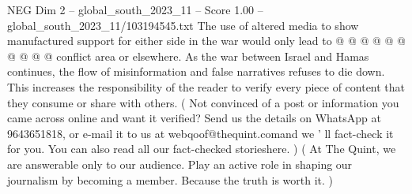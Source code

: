 \begin{textsample}{NEG Dim 2 – global\_south\_2023\_11 – Score 1.00 – global\_south\_2023\_11/103194545.txt}
The use of altered media to show manufactured support for either side in the war would only lead to @ @ @ @ @ @ @ @ @ @ conflict area or elsewhere.
As the war between Israel and Hamas continues, the flow of misinformation and false narratives refuses to die down.
This increases the responsibility of the reader to verify every piece of content that they consume or share with others. ( Not convinced of a post or information you came across online and want it verified?
Send us the details on WhatsApp at 9643651818, or e-mail it to us at webqoof@thequint.comand we ' ll fact-check it for you.
You can also read all our fact-checked storieshere. ) ( At The Quint, we are answerable only to our audience.
Play an active role in shaping our journalism by becoming a member.
Because the truth is worth it. )

\end{textsample}
